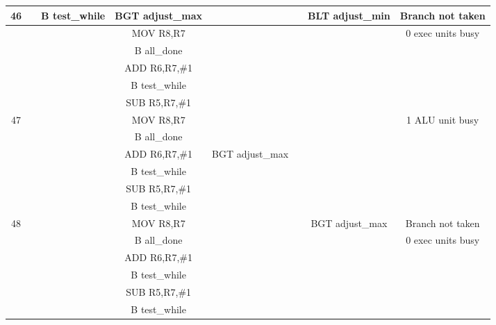 \documentclass{article}
\begin{document}
{\begin{landscape}
\begin{longtable}{|c|c|c|c|c:c|c|c|}
    46 & & B test\_while & BGT adjust\_max & & & BLT adjust\_min & Branch not taken \\ \hline
     & & & MOV R8,R7 & & & & 0 exec units busy \\ \hline
     & & & B all\_done & &  & & \\ \hline
     &  &  & ADD R6,R7,\#1 & &  & & \\ \hline
     &  &  & B test\_while &  &  &  & \\ \hline
     &  &  & SUB R5,R7,\#1 &  &  &  & \\ \hline \hline
     
    47 & & & MOV R8,R7 & & & & 1 ALU unit busy \\ \hline
     & & & B all\_done & & & & \\ \hline
     & & & ADD R6,R7,\#1 & BGT adjust\_max &  & & \\ \hline
     &  &  & B test\_while & &  & & \\ \hline
     &  &  & SUB R5,R7,\#1 &  &  &  & \\ \hline
     &  &  & B test\_while &  &  &  & \\ \hline \hline
     
    48 & & & MOV R8,R7 & & & BGT adjust\_max & Branch not taken \\ \hline
     & & & B all\_done & & & & 0 exec units busy \\ \hline
     & & & ADD R6,R7,\#1 & &  & & \\ \hline
     &  &  & B test\_while & &  & & \\ \hline
     &  &  & SUB R5,R7,\#1 &  &  &  & \\ \hline
     &  &  & B test\_while &  &  &  & \\ \hline \hline
     

\end{longtable}
\end{landscape}}
\end{document}
